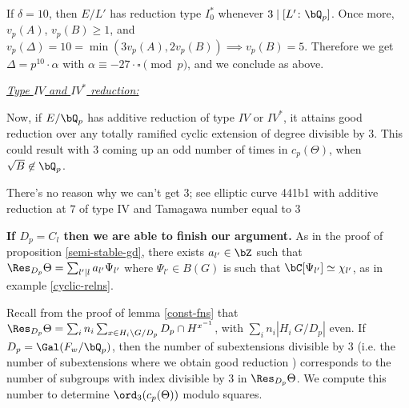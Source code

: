 If $\delta = 10$, then $E / L'$ has reduction type $I_0^*$ whenever $3 \mid [ L' \colon \bQ_p]$. Once more, $v_p(A)$, $v_p(B) \geq 1$, and $v_p(\Delta) = 10 = \min(3 v_p(A), 2 v_p(B)) \implies v_p(B) = 5$. Therefore we get $\Delta = p^{10} \cdot \alpha$ with $\alpha \equiv -27\cdot\square \pmod p$, and we conclude as above.

\vspace{1em}

\noindent\underline{\textit{Type $IV$ and $IV^*$ reduction:}}

Now, if $E /\bQ_p$ has additive reduction of type $IV$ or $IV^*$, it attains good reduction over any totally ramified cyclic extension of degree divisible by $3$. This could result with $3$ coming up an odd number of times in $c_p(\Theta)$, when $\sqrt{B} \not\in \bQ_p$. 
\begin{rem}
   There's no reason why we can't get 3; see elliptic curve 441b1 with additive reduction at $7$ of type IV and Tamagawa number equal to $3$
\end{rem}

\textbf{If $D_p = C_l$ then we are able to finish our argument.} As in the proof of proposition \ref{semi-stable-gd}, there exists $a_{l'} \in \bZ$ such that $\Res_{D_p}\Theta = \sum_{l' \mid l} a_{l'} \Psi_{l'}$ where $\Psi_{l'} \in B(G)$ is such that $\bC[\Psi_{l'}] \simeq \chi_{l'}$, as in example \ref{cyclic-relns}.

Recall from the proof of lemma \ref{const-fns} that $\Res_{D_p} \Theta = \sum_i n_i \sum_{x \in H_i \backslash G / D_p} D_p \cap H^{x^{-1}}$, with $\sum_i n_i | H_i \ G / D_p|$ even. If $D_p = \Gal(F_w / \bQ_p)$, then the number of subextensions divisible by $3$ (i.e. the number of subextensions where we obtain good reduction ) corresponds to the number of subgroups with index divisible by $3$ in $\Res_{D_p}\Theta$. We compute this number to determine $\ord_3(c_p(\Theta))$ modulo squares.

